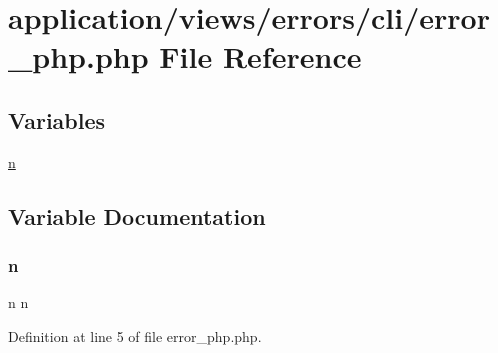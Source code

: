 \hypertarget{cli_2error__php_8php}{}\section{application/views/errors/cli/error\+\_\+php.php File Reference}
\label{cli_2error__php_8php}
\subsection*{Variables}
\begin{DoxyCompactItemize}
\item 
\mbox{\hyperlink{cli_2error__php_8php_a2e6b16bbc42094e4c51ade3c10afdcf1}{n}}
\end{DoxyCompactItemize}


\subsection{Variable Documentation}
\mbox{\label{cli_2error__php_8php_a2e6b16bbc42094e4c51ade3c10afdcf1}} 
\subsubsection{\texorpdfstring{n}{n}}
{\footnotesize\ttfamily n n}



Definition at line 5 of file error\+\_\+php.\+php.

